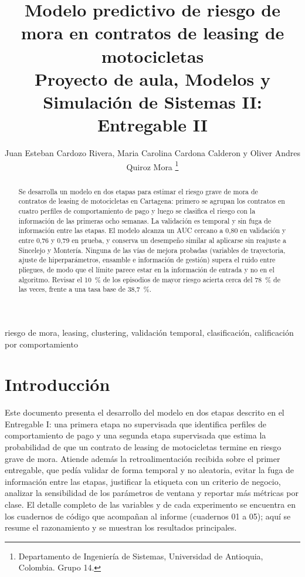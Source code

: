 \documentclass[journal]{IEEEtran}
\begin{document}
\title{Modelo predictivo de riesgo de mora en contratos de leasing de motocicletas\\
\large Proyecto de aula, Modelos y Simulación de Sistemas II: Entregable II}

\author{Juan Esteban Cardozo Rivera, Maria Carolina Cardona Calderon y Oliver Andres Quiroz Mora%
\thanks{Departamento de Ingeniería de Sistemas, Universidad de Antioquia, Colombia. Grupo 14.}}

\maketitle

\begin{abstract}
Se desarrolla un modelo en dos etapas para estimar el riesgo grave de mora de contratos de leasing de motocicletas en Cartagena: primero se agrupan los contratos en cuatro perfiles de comportamiento de pago y luego se clasifica el riesgo con la información de las primeras ocho semanas. La validación es temporal y sin fuga de información entre las etapas. El modelo alcanza un AUC cercano a 0,80 en validación y entre 0,76 y 0,79 en prueba, y conserva un desempeño similar al aplicarse sin reajuste a Sincelejo y Montería. Ninguna de las vías de mejora probadas (variables de trayectoria, ajuste de hiperparámetros, ensamble e información de gestión) supera el ruido entre pliegues, de modo que el límite parece estar en la información de entrada y no en el algoritmo. Revisar el 10~\% de los episodios de mayor riesgo acierta cerca del 78~\% de las veces, frente a una tasa base de 38,7~\%.
\end{abstract}

\begin{IEEEkeywords}
riesgo de mora, leasing, clustering, validación temporal, clasificación, calificación por comportamiento
\end{IEEEkeywords}

\section{Introducción}

Este documento presenta el desarrollo del modelo en dos etapas descrito en el Entregable I: una primera etapa no supervisada que identifica perfiles de comportamiento de pago y una segunda etapa supervisada que estima la probabilidad de que un contrato de leasing de motocicletas termine en riesgo grave de mora. Atiende además la retroalimentación recibida sobre el primer entregable, que pedía validar de forma temporal y no aleatoria, evitar la fuga de información entre las etapas, justificar la etiqueta con un criterio de negocio, analizar la sensibilidad de los parámetros de ventana y reportar más métricas por clase. El detalle completo de las variables y de cada experimento se encuentra en los cuadernos de código que acompañan al informe (cuadernos 01 a 05); aquí se resume el razonamiento y se muestran los resultados principales.
\end{document}
